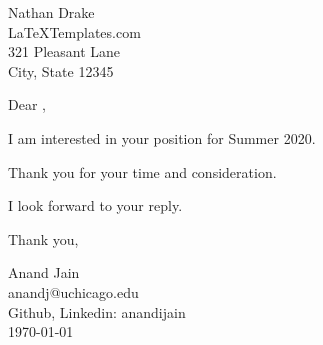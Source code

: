 \documentclass[11pt,a4paper,english]{letter} %
\begin{document}

\begin{letter}{Nathan Drake \\ LaTeXTemplates.com \\ 321 Pleasant Lane \\ City, State 12345} %


Dear ,

I am interested in your  position for Summer 2020.


Thank you for your time and consideration.

I look forward to your reply.

Thank you, 

Anand Jain\\
anandj@uchicago.edu\\
Github, Linkedin: anandijain\\
\today\\
\end{letter}
\end{document}
